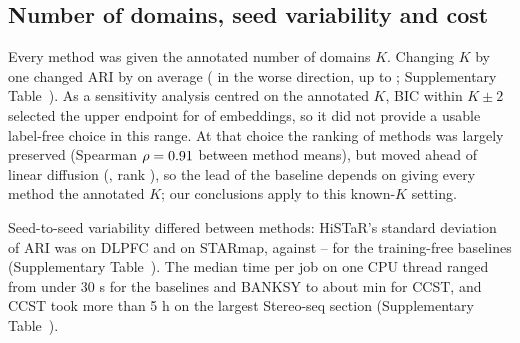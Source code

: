 \documentclass[unnumsec,webpdf,contemporary,large]{oup-authoring-template}
\begin{document}
\subsection{Number of domains, seed variability and cost}

Every method was given the annotated number of domains $K$. Changing $K$ by one changed ARI by \kOneAvg{} on average (\kOneMean{} in the
worse direction, up to \kOneMax{}; Supplementary Table~\STk). As a sensitivity analysis centred on the annotated $K$, BIC within $K\pm2$ selected the upper endpoint for \kBicEdge{} of \kN{}
embeddings, so it did not provide a usable label-free choice in this range. At that choice the ranking of methods was largely preserved (Spearman $\rho=0.91$ between method
means), but \kAboveLinBic{} moved ahead of linear diffusion (\kLinBic, rank \kLinBicRank), so the lead of the baseline depends on giving every method the annotated $K$; our conclusions apply to this known-$K$ setting.

Seed-to-seed variability differed between methods: HiSTaR's standard deviation of ARI was \sdHistarDlpfc{} on DLPFC and \sdHistarStarmap{} on
STARmap, against \sdBaseLo--\sdBaseHi{} for the training-free baselines (Supplementary Table~\STseeds). The median time per job on one CPU
thread ranged from under 30 s for the baselines and BANKSY to about \timeMinCcst{} min for CCST, and CCST took more than 5 h on the largest
Stereo-seq section (Supplementary Table~\STres).
\end{document}
